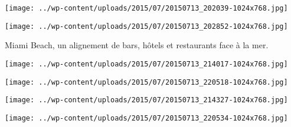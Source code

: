  

 

\begin{center} \texttt{[image: ../wp-content/uploads/2015/07/20150713\_202039-1024x768.jpg]} \end{center}

 

 

\begin{center} \texttt{[image: ../wp-content/uploads/2015/07/20150713\_202852-1024x768.jpg]} \end{center}

 

 Miami Beach, un alignement de bars, hôtels et restaurants face à la mer. 

 

\begin{center} \texttt{[image: ../wp-content/uploads/2015/07/20150713\_214017-1024x768.jpg]} \end{center}

 

 

\begin{center} \texttt{[image: ../wp-content/uploads/2015/07/20150713\_220518-1024x768.jpg]} \end{center}

 

 

\begin{center} \texttt{[image: ../wp-content/uploads/2015/07/20150713\_214327-1024x768.jpg]} \end{center}

 

 

\begin{center} \texttt{[image: ../wp-content/uploads/2015/07/20150713\_220534-1024x768.jpg]} \end{center}




 
 
